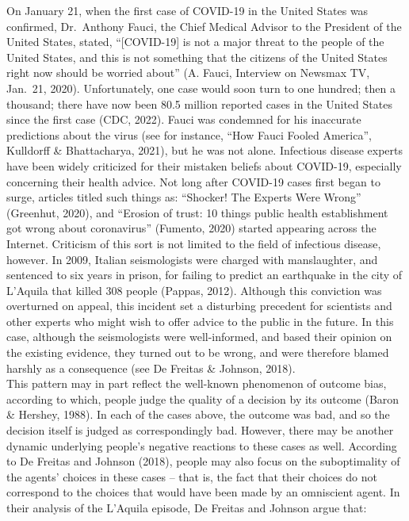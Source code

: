 \documentclass[
  man,floatsintext]{apa6}
\begin{document}
On January 21, when the first case of COVID-19 in the United States was confirmed, Dr.~Anthony Fauci, the Chief Medical Advisor to the President of the United States, stated, ``{[}COVID-19{]} is not a major threat to the people of the United States, and this is not something that the citizens of the United States right now should be worried about'' (A. Fauci, Interview on Newsmax TV, Jan.~21, 2020). Unfortunately, one case would soon turn to one hundred; then a thousand; there have now been 80.5 million reported cases in the United States since the first case (CDC, 2022). Fauci was condemned for his inaccurate predictions about the virus (see for instance, ``How Fauci Fooled America'', Kulldorff \& Bhattacharya, 2021), but he was not alone. Infectious disease experts have been widely criticized for their mistaken beliefs about COVID-19, especially concerning their health advice. Not long after COVID-19 cases first began to surge, articles titled such things as: ``Shocker! The Experts Were Wrong'' (Greenhut, 2020), and ``Erosion of trust: 10 things public health establishment got wrong about coronavirus'' (Fumento, 2020) started appearing across the Internet. Criticism of this sort is not limited to the field of infectious disease, however. In 2009, Italian seismologists were charged with manslaughter, and sentenced to six years in prison, for failing to predict an earthquake in the city of L'Aquila that killed 308 people (Pappas, 2012). Although this conviction was overturned on appeal, this incident set a disturbing precedent for scientists and other experts who might wish to offer advice to the public in the future. In this case, although the seismologists were well-informed, and based their opinion on the existing evidence, they turned out to be wrong, and were therefore blamed harshly as a consequence (see De Freitas \& Johnson, 2018).\\
This pattern may in part reflect the well-known phenomenon of outcome bias, according to which, people judge the quality of a decision by its outcome (Baron \& Hershey, 1988). In each of the cases above, the outcome was bad, and so the decision itself is judged as correspondingly bad. However, there may be another dynamic underlying people's negative reactions to these cases as well. According to De Freitas and Johnson (2018), people may also focus on the suboptimality of the agents' choices in these cases -- that is, the fact that their choices do not correspond to the choices that would have been made by an omniscient agent. In their analysis of the L'Aquila episode, De Freitas and Johnson argue that:\\
\end{document}
